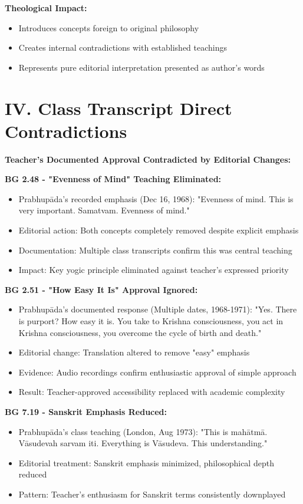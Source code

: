 \documentclass[11pt,twoside]{book}
\begin{document}
\textbf{\textbf{Theological Impact:}}
\begin{itemize}
\item Introduces concepts foreign to original philosophy
\item Creates internal contradictions with established teachings
\item Represents pure editorial interpretation presented as author's words
\end{itemize}
\section*{IV. Class Transcript Direct Contradictions}
\label{sec:org016adba}

\textbf{\textbf{Teacher's Documented Approval Contradicted by Editorial Changes:}}

\textbf{\textbf{BG 2.48 - "Evenness of Mind" Teaching Eliminated:}}
\begin{itemize}
\item Prabhupāda's recorded emphasis (Dec 16, 1968): "Evenness of mind. This is very important. Samatvam. Evenness of mind."
\item Editorial action: Both concepts completely removed despite explicit emphasis
\item Documentation: Multiple class transcripts confirm this was central teaching
\item Impact: Key yogic principle eliminated against teacher's expressed priority
\end{itemize}

\textbf{\textbf{BG 2.51 - "How Easy It Is" Approval Ignored:}}
\begin{itemize}
\item Prabhupāda's documented response (Multiple dates, 1968-1971): "Yes. There is purport? How easy it is. You take to Krishna consciousness, you act in Krishna consciousness, you overcome the cycle of birth and death."
\item Editorial change: Translation altered to remove "easy" emphasis
\item Evidence: Audio recordings confirm enthusiastic approval of simple approach
\item Result: Teacher-approved accessibility replaced with academic complexity
\end{itemize}

\textbf{\textbf{BG 7.19 - Sanskrit Emphasis Reduced:}}
\begin{itemize}
\item Prabhupāda's class teaching (London, Aug 1973): "This is mahātmā. Vāsudevah sarvam iti. Everything is Vāsudeva. This understanding."
\item Editorial treatment: Sanskrit emphasis minimized, philosophical depth reduced
\item Pattern: Teacher's enthusiasm for Sanskrit terms consistently downplayed
\end{itemize}
\end{document}
